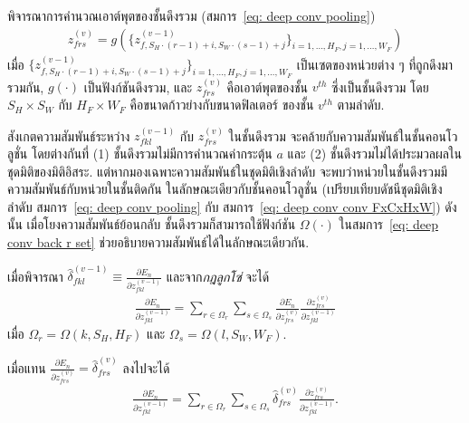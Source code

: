 พิจารณาการคำนวณเอาต์พุตของชั้นดึงรวม (สมการ~\ref{eq: deep conv pooling})
\begin{eqnarray}
z_{frs}^{(v)} 
= g( \{ z_{f, S_H \cdot (r-1)+i, S_W \cdot (s-1)+j}^{(v-1)} \}_{i=1,\ldots, H_F, j=1,\ldots, W_F} ) 
\label{eq: deep pooling z = g(set)}
\end{eqnarray}
เมื่อ 
$\{ z_{f, S_H \cdot (r-1)+i, S_W \cdot (s-1)+j}^{(v-1)} \}_{i=1,\ldots, H_F, j=1,\ldots, W_F}$
เป็นเซตของหน่วยต่าง ๆ ที่ถูกดึงมารวมกัน,
$g(\cdot)$ เป็นฟังก์ชันดึงรวม, และ
$z_{frs}^{(v)}$ คือเอาต์พุตของชั้น $v^{th}$ ซึ่งเป็นชั้นดึงรวม
โดย
$S_H \times S_W$ 
กับ $H_F \times W_F$ 
คือขนาดก้าวย่างกับขนาดฟิลเตอร์ ของชั้น $v^{th}$ ตามลำดับ.

สังเกตความสัมพันธ์ระหว่าง $z_{fkl}^{(v-1)}$ กับ $z_{frs}^{(v)}$ ในชั้นดึงรวม
จะคล้ายกับความสัมพันธ์ในชั้นคอนโวลูชั่น โดยต่างกันที่
(1) ชั้นดึงรวมไม่มีการคำนวณค่ากระตุ้น $a$
และ
(2) ชั้นดึงรวมไม่ได้ประมวลผลในชุดมิติของมิติอิสระ.
แต่หากมองเฉพาะความสัมพันธ์ในชุดมิติเชิงลำดับ จะพบว่าหน่วยในชั้นดึงรวมมีความสัมพันธ์กับหน่วยในชั้นติดกัน ในลักษณะเดียวกับชั้นคอนโวลูชั่น 
(เปรียบเทียบดัชนีชุดมิติเชิงลำดับ สมการ~\ref{eq: deep conv pooling} กับ สมการ~\ref{eq: deep conv conv FxCxHxW})
ดังนั้น เมื่อโยงความสัมพันธ์ย้อนกลับ ชั้นดึงรวมก็สามารถใช้ฟังก์ชัน $\Omega(\cdot)$ ในสมการ~\ref{eq: deep conv back r set}
ช่วยอธิบายความสัมพันธ์ได้ในลักษณะเดียวกัน.

เมื่อพิจารณา $\hat{\delta}_{fkl}^{(v-1)} \equiv \frac{\partial E_n}{\partial z_{fkl}^{(v-1)}}$
และจาก\textit{กฎลูกโซ่} จะได้
\begin{eqnarray}
\frac{\partial E_n}{\partial z_{fkl}^{(v-1)}}
= \sum_{r \in \Omega_r} \sum_{s \in \Omega_s} \frac{\partial E_n}{\partial z_{frs}^{(v)}}
\frac{\partial z_{frs}^{(v)}}{\partial z_{fkl}^{(v-1)}}
\label{eq: deep conv delta layer m 1 next pooling}
\end{eqnarray} 
เมื่อ $\Omega_r = \Omega(k, S_H, H_F)$ และ
$\Omega_s = \Omega(l, S_W, W_F)$.

เมื่อแทน $\frac{\partial E_n}{\partial z_{frs}^{(v)}} = \hat{\delta}_{frs}^{(v)}$ ลงไปจะได้
\begin{eqnarray}
\frac{\partial E_n}{\partial z_{fkl}^{(v-1)}}
= \sum_{r \in \Omega_r} \sum_{s \in \Omega_s} \hat{\delta}_{frs}^{(v)}
\frac{\partial z_{frs}^{(v)}}{\partial z_{fkl}^{(v-1)}}
\label{eq: deep conv grad delta hat next pooling} .
\end{eqnarray}

